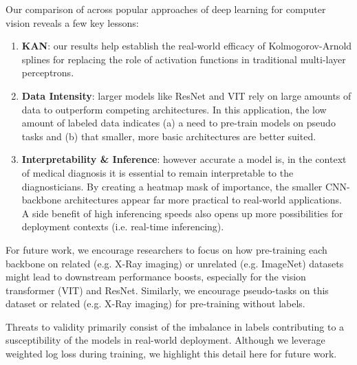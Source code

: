 \documentclass[conference]{IEEEtran}
\begin{document}
Our comparison of across popular approaches of deep learning for computer vision reveals a few key lessons:
\begin{enumerate}
    \item \textbf{KAN}: our results help establish the real-world efficacy of Kolmogorov-Arnold splines for replacing the role of activation functions in traditional multi-layer perceptrons.

    \item \textbf{Data Intensity}: larger models like ResNet and VIT rely on large amounts of data to outperform competing architectures. In this application, the low amount of labeled data indicates (a) a need to pre-train models on pseudo tasks and (b) that smaller, more basic architectures are better suited.

    \item \textbf{Interpretability \& Inference}: however accurate a model is, in the context of medical diagnosis it is essential to remain interpretable to the diagnosticians. By creating a heatmap mask of importance, the smaller CNN-backbone architectures appear far more practical to real-world applications. A side benefit of high inferencing speeds also opens up more possibilities for deployment contexts (i.e. real-time inferencing).
\end{enumerate}

For future work, we encourage researchers to focus on how pre-training each backbone on related (e.g. X-Ray imaging) or unrelated (e.g. ImageNet) datasets might lead to downstream performance boosts, especially for the vision transformer (VIT) and ResNet. Similarly, we encourage pseudo-tasks on this dataset or related (e.g. X-Ray imaging) for pre-training without labels.

Threats to validity primarily consist of the imbalance in labels contributing to a susceptibility of the models in real-world deployment. Although we leverage weighted log loss during training, we highlight this detail here for future work.


\end{document}
